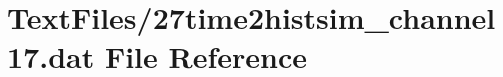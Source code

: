 \hypertarget{27time2histsim__channel17_8dat}{}\section{Text\+Files/27time2histsim\+\_\+channel17.dat File Reference}
\label{27time2histsim__channel17_8dat}
